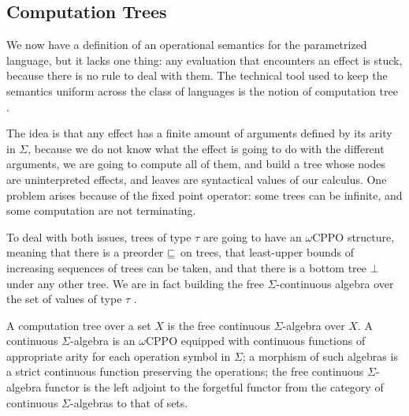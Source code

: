 \subsection{Computation Trees}

We now have a definition of an operational semantics 
for the parametrized language, but it lacks one thing: 
any evaluation that encounters an effect is stuck, because 
there is no rule to deal with them. The technical tool used to keep the 
semantics uniform across the class of languages 
is the notion of computation tree \cite{plotkin2001adequacy} \cite{gom}.

The idea is that any effect has a finite amount of arguments defined 
by its arity in $\Sigma$, because we do not know what the effect is going 
to do with the different arguments, we are going to compute all of them, 
and build a tree whose nodes are uninterpreted effects, and leaves are 
syntactical values of our calculus. One problem arises because of 
the fixed point operator: some trees can be infinite, and some computation 
are not terminating. 

To deal with both issues, trees of type $\tau$ are going to have an $\omega$CPPO 
structure, meaning that there is a preorder $\sqsubseteq$ on trees,
that least-upper bounds of increasing sequences of trees 
can be taken, and that there is a bottom tree $\bot$
under any other tree. We are in fact building the free $\Sigma$-continuous algebra
over the set of values of type $\tau$ \cite{abramsky1994}.

\begin{adefinition}
    A computation tree over a set $X$ is the
    free continuous $\Sigma$-algebra over $X$.  
    A continuous $\Sigma$-algebra is an $\omega$CPPO 
    equipped with continuous functions of appropriate arity 
    for each operation symbol in $\Sigma$; 
    a morphism of such algebras is a strict continuous
    function preserving the operations; the free 
    continuous $\Sigma$-algebra functor
    is the left adjoint to the forgetful 
    functor from the category of continuous $\Sigma$-algebras to that of
    sets.
\end{adefinition}


